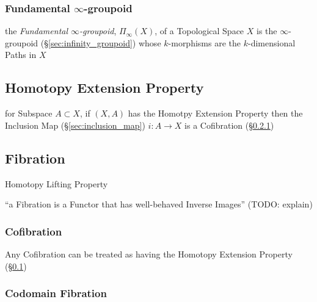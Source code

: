 \subsubsection{Fundamental $\infty$-groupoid}
\label{sec:fundamental_infinity_groupoid}


the \emph{Fundamental $\infty$-groupoid}, $\Pi_\infty(X)$, of a Topological
Space $X$ is the $\infty$-groupoid (\S\ref{sec:infinity_groupoid}) whose
$k$-morphisms are the $k$-dimensional Paths in $X$



\subsection{Homotopy Extension Property}\label{sec:homotopy_extension}

for Subspace $A \subset X$, if $(X,A)$ has the Homotpy Extension
Property then the Inclusion Map (\S\ref{sec:inclusion_map}) $i : A
\rightarrow X$ is a Cofibration (\S\ref{sec:cofibration})



\subsection{Fibration}\label{sec:fibration}

Homotopy Lifting Property

``a Fibration is a Functor that has well-behaved Inverse Images'' (TODO:
explain)



\subsubsection{Cofibration}\label{sec:cofibration}

Any Cofibration can be treated as having the Homotopy Extension
Property (\S\ref{sec:homotopy_extension})



\subsubsection{Codomain Fibration}\label{sec:codomain_fibration}

